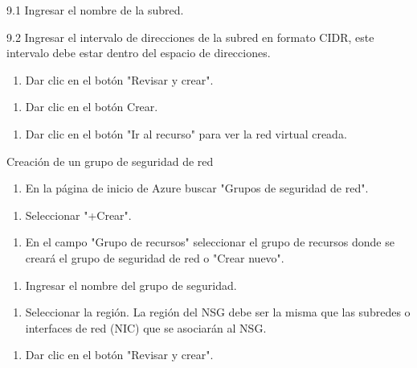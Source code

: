 9.1 Ingresar el nombre de la subred.

9.2 Ingresar el intervalo de direcciones de la subred en formato CIDR, este intervalo debe estar dentro del espacio de direcciones.

\begin{enumerate}
\item Dar clic en el botón "Revisar y crear".
\end{enumerate}

\begin{enumerate}
\item Dar clic en el botón Crear.
\end{enumerate}

\begin{enumerate}
\item Dar clic en el botón "Ir al recurso" para ver la red virtual creada.
\end{enumerate}

Creación de un grupo de seguridad de red

\begin{enumerate}
\item En la página de inicio de Azure buscar "Grupos de seguridad de red".
\end{enumerate}

\begin{enumerate}
\item Seleccionar "+Crear".
\end{enumerate}

\begin{enumerate}
\item En el campo "Grupo de recursos" seleccionar el grupo de recursos donde se creará el grupo de seguridad de red o "Crear nuevo".
\end{enumerate}

\begin{enumerate}
\item Ingresar el nombre del grupo de seguridad.
\end{enumerate}

\begin{enumerate}
\item Seleccionar la región. La región del NSG debe ser la misma que las subredes o interfaces de red (NIC) que se asociarán al NSG.
\end{enumerate}

\begin{enumerate}
\item Dar clic en el botón "Revisar y crear".
\end{enumerate}

